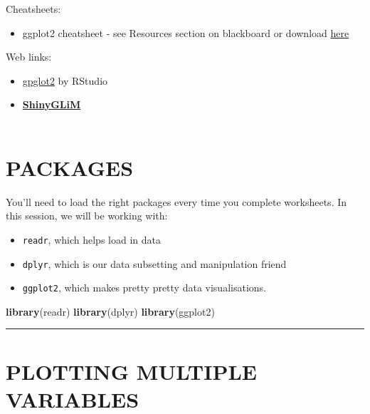 \documentclass[
]{book}
\newenvironment{Shaded}{\begin{snugshade}}{\end{snugshade}}
\newcommand{\KeywordTok}[1]{\textcolor[rgb]{0.13,0.29,0.53}{\textbf{#1}}}
\newcommand{\NormalTok}[1]{#1}
\providecommand{\tightlist}{%
  \setlength{\itemsep}{0pt}\setlength{\parskip}{0pt}}
\begin{document}
Cheatsheets:

\begin{itemize}
\tightlist
\item
  ggplot2 cheatsheet - see Resources section on blackboard or
  download \href{https://rstudio.com/wp-content/uploads/2015/03/ggplot2-cheatsheet.pdf}{here}
  ~
\end{itemize}

Web links:

\begin{itemize}
\item
  \href{https://ggplot2.tidyverse.org/}{gpglot2} by RStudio\\
  \hspace*{0.333em}
\item
  \href{https://iainmstott.shinyapps.io/ShinyGLiM}{\textbf{ShinyGLiM}}\\
  ~\\
\end{itemize}

\hypertarget{packages}{%
\section{PACKAGES}\label{packages}}

You'll need to load the right packages every time you complete worksheets. In
this session, we will be working with:

\begin{itemize}
\tightlist
\item
  \texttt{readr}, which helps load in data
\item
  \texttt{dplyr}, which is our data subsetting and manipulation friend
\item
  \texttt{ggplot2}, which makes pretty pretty data visualisations.
\end{itemize}

\begin{Shaded}
\begin{Highlighting}[]
\KeywordTok{library}\NormalTok{(readr)}
\KeywordTok{library}\NormalTok{(dplyr)}
\KeywordTok{library}\NormalTok{(ggplot2)}
\end{Highlighting}
\end{Shaded}

\begin{center}\rule{0.5\linewidth}{0.5pt}\end{center}

\hypertarget{plotting-multiple-variables}{%
\section{PLOTTING MULTIPLE VARIABLES}\label{plotting-multiple-variables}}
\end{document}
